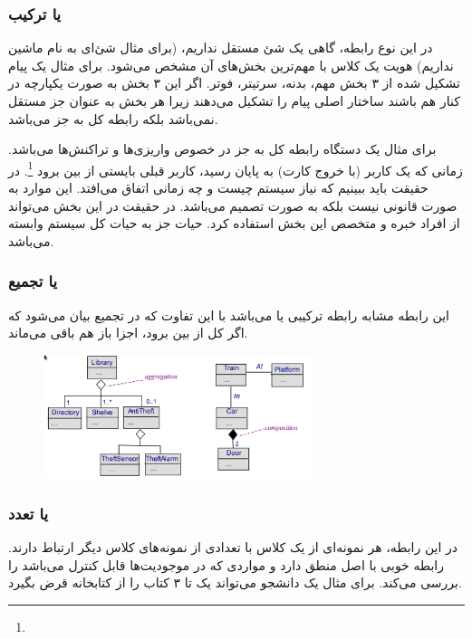 \subsubsection{ یا ترکیب}

در این نوع رابطه، گاهی یک شئ مستقل نداریم، (برای مثال شئ‌ای به نام ماشین نداریم)
هویت یک کلاس با مهم‌ترین بخش‌های آن مشخص می‌شود. برای مثال یک پیام تشکیل شده از
۳ بخش مهم، بدنه، سرتیتر، فوتر. اگر این ۳ بخش به صورت یکپارچه در کنار هم باشند
ساختار اصلی پیام را تشکیل می‌دهند زیرا هر بخش به عنوان جز مستقل نمی‌باشد بلکه
رابطه کل به جز می‌باشد.

برای مثال  یک دستگاه  رابطه کل به جز در خصوص واریزی‌ها و
تراکنش‌ها می‌باشد. زمانی که  یک کاربر (با خروج کارت) به پایان رسید،
 کاربر قبلی بایستی از بین برود \footnote{}. در حقیقت
باید ببینیم که نیاز سیستم چیست و چه زمانی اتفاق می‌افتد. این موارد به صورت
قانونی نیست بلکه به صورت تصمیم می‌باشد. در حقیقت در این بخش می‌تواند از افراد
خبره و متخصص این بخش استفاده کرد. حیات جز به حیات کل سیستم وابسته می‌باشد.

\subsubsection{ یا تجمیع}

این رابطه مشابه رابطه ترکیبی یا  می‌باشد با این تفاوت که در
تجمیع بیان می‌شود که اگر کل از بین برود، اجزا باز هم باقی می‌ماند.

\begin{figure}[H]
    \centering
    \includegraphics[width=0.7\textwidth]{images/aggregation_relation.png}
    \caption{}
\end{figure}

\subsubsection{ یا تعدد}

در این رابطه، هر نمونه‌ای از یک کلاس با تعدادی از نمونه‌های کلاس دیگر ارتباط
دارند. رابطه خوبی با اصل منطق دارد و مواردی که در موجودیت‌ها قابل کنترل می‌باشد
را بررسی می‌کند. برای مثال یک دانشجو می‌تواند یک تا ۳ کتاب را از کتابخانه قرض
بگیرد.

